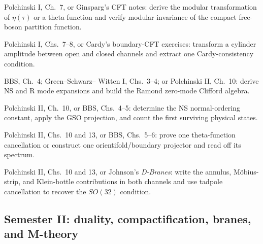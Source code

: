 \documentclass[11pt]{article}
\begin{document}
\begin{description}[leftmargin=2.1cm,labelwidth=1.55cm,labelsep=0.35cm,align=left,itemsep=4pt]
  \item[Week 9] Polchinski I, Ch.~7, or Ginsparg's CFT notes: derive the modular
  transformation of $\eta(\tau)$ or a theta function and verify modular
  invariance of the compact free-boson partition function.

  \item[Week 10] Polchinski I, Chs.~7--8, or Cardy's boundary-CFT exercises:
  transform a cylinder amplitude between open and closed channels and extract
  one Cardy-consistency condition.

  \item[Week 11] BBS, Ch.~4; Green--Schwarz--
  Witten I, Chs.~3--4; or Polchinski II, Ch.~10: derive NS and R mode expansions
  and build the Ramond zero-mode Clifford algebra.

  \item[Week 12] Polchinski II, Ch.~10, or BBS,
  Chs.~4--5: determine the NS normal-ordering constant, apply the GSO projection,
  and count the first surviving physical states.

  \item[Week 13] Polchinski II, Chs.~10 and 13, or BBS, Chs.~5--6: prove one
  theta-function cancellation or construct one
  orientifold/boundary projector and read off its spectrum.

  \item[Week 14] Polchinski II, Chs.~10 and 13, or Johnson's \emph{D-Branes}:
  write the annulus, M\"obius-strip, and Klein-bottle contributions in both
  channels and use tadpole cancellation to recover the $SO(32)$ condition.
\end{description}

\subsection{Semester II: duality, compactification, branes, and M-theory}
\end{document}
